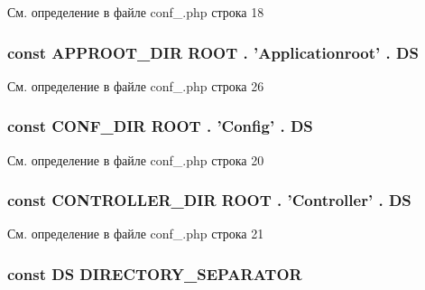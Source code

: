 См. определение в файле conf\-\_\-.\-php строка 18

\hypertarget{conf___8php_ae32575aa3e9747cd2ffbf47d3bd53850}{
\subsubsection[{A\-P\-P\-R\-O\-O\-T\-\_\-\-D\-I\-R}]{\setlength{\rightskip}{0pt plus 5cm}const A\-P\-P\-R\-O\-O\-T\-\_\-\-D\-I\-R {\bf R\-O\-O\-T} . 'Applicationroot' . {\bf D\-S}}}\label{conf___8php_ae32575aa3e9747cd2ffbf47d3bd53850}


См. определение в файле conf\-\_\-.\-php строка 26

\hypertarget{conf___8php_acc332eaa302e50df333137a1642afc00}{
\subsubsection[{C\-O\-N\-F\-\_\-\-D\-I\-R}]{\setlength{\rightskip}{0pt plus 5cm}const C\-O\-N\-F\-\_\-\-D\-I\-R {\bf R\-O\-O\-T} . '{\bf Config}' . {\bf D\-S}}}\label{conf___8php_acc332eaa302e50df333137a1642afc00}


См. определение в файле conf\-\_\-.\-php строка 20

\hypertarget{conf___8php_a764bb19c7c9d1c48e90b21b30e1b604a}{
\subsubsection[{C\-O\-N\-T\-R\-O\-L\-L\-E\-R\-\_\-\-D\-I\-R}]{\setlength{\rightskip}{0pt plus 5cm}const C\-O\-N\-T\-R\-O\-L\-L\-E\-R\-\_\-\-D\-I\-R {\bf R\-O\-O\-T} . '{\bf Controller}' . {\bf D\-S}}}\label{conf___8php_a764bb19c7c9d1c48e90b21b30e1b604a}


См. определение в файле conf\-\_\-.\-php строка 21

\hypertarget{conf___8php_ae073998f73900b8375397889044c8313}{
\subsubsection[{D\-S}]{\setlength{\rightskip}{0pt plus 5cm}const D\-S D\-I\-R\-E\-C\-T\-O\-R\-Y\-\_\-\-S\-E\-P\-A\-R\-A\-T\-O\-R}}\label{conf___8php_ae073998f73900b8375397889044c8313}



